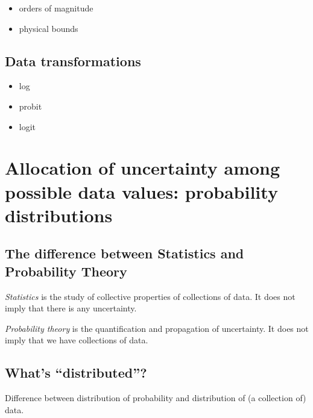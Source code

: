 \documentclass[
  letterpaper,
  DIV=11,
  numbers=noendperiod,
  oneside]{scrreprt}
\begin{document}
\begin{itemize}
\item
  orders of magnitude
\item
  physical bounds
\end{itemize}

\hypertarget{data-transformations}{%
\section{Data transformations}\label{data-transformations}}

\begin{itemize}
\item
  log
\item
  probit
\item
  logit
\end{itemize}


\hypertarget{allocation-of-uncertainty-among-possible-data-values-probability-distributions}{%
\chapter{Allocation of uncertainty among possible data values:
probability
distributions}\label{allocation-of-uncertainty-among-possible-data-values-probability-distributions}}

\hypertarget{the-difference-between-statistics-and-probability-theory}{%
\section{The difference between Statistics and Probability
Theory}\label{the-difference-between-statistics-and-probability-theory}}

\emph{Statistics} is the study of collective properties of collections
of data. It does not imply that there is any uncertainty.

\emph{Probability theory} is the quantification and propagation of
uncertainty. It does not imply that we have collections of data.

\hypertarget{whats-distributed}{%
\section{What's ``distributed''?}\label{whats-distributed}}

Difference between distribution of probability and distribution of (a
collection of) data.
\end{document}
